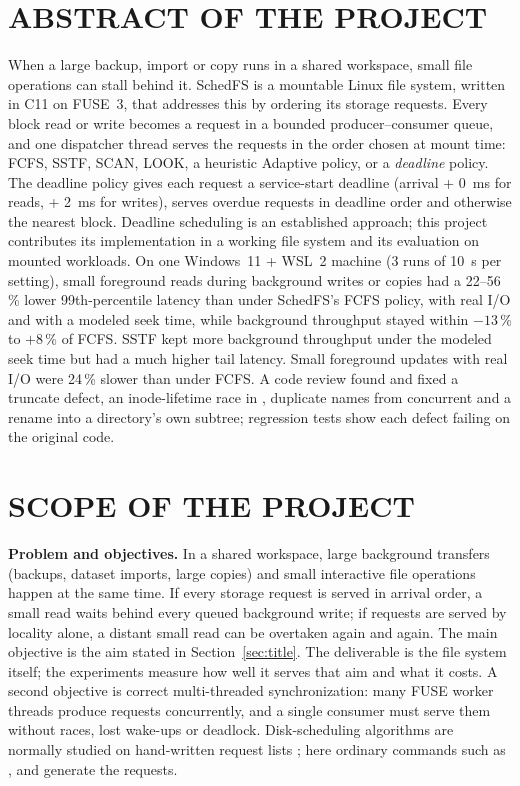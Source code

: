 \documentclass[12pt,a4paper]{article}
\DeclareRobustCommand{\code}[1]{\texttt{\detokenize{#1}}}
\begin{document}
\section{ABSTRACT OF THE PROJECT}
\label{sec:abstract}
When a large backup, import or copy runs in a shared workspace, small file operations can stall behind it. SchedFS is a mountable Linux file system, written in C11 on FUSE~3, that addresses this by ordering its storage requests. Every block read or write becomes a request in a bounded producer--consumer queue, and one dispatcher thread serves the requests in the order chosen at mount time: FCFS, SSTF, SCAN, LOOK, a heuristic Adaptive policy, or a \emph{deadline} policy. The deadline policy gives each request a service-start deadline (arrival + 0~ms for reads, + 2~ms for writes), serves overdue requests in deadline order and otherwise the nearest block. Deadline scheduling is an established approach; this project contributes its implementation in a working file system and its evaluation on mounted workloads. On one Windows~11 + WSL~2 machine (3 runs of 10~s per setting), small foreground reads during background writes or copies had a 22--56\,\% lower 99th-percentile latency than under SchedFS's FCFS policy, with real \code{O_DIRECT} I/O and with a modeled seek time, while background throughput stayed within $-13$\,\% to $+8$\,\% of FCFS. SSTF kept more background throughput under the modeled seek time but had a much higher tail latency. Small foreground updates with real I/O were 24\,\% slower than under FCFS. A code review found and fixed a truncate defect, an inode-lifetime race in \code{unlink}, duplicate names from concurrent \code{create} and a rename into a directory's own subtree; regression tests show each defect failing on the original code.

\section{SCOPE OF THE PROJECT}
\label{sec:scope}
\textbf{Problem and objectives.} In a shared workspace, large background transfers (backups, dataset imports, large copies) and small interactive file operations happen at the same time. If every storage request is served in arrival order, a small read waits behind every queued background write; if requests are served by locality alone, a distant small read can be overtaken again and again. The main objective is the aim stated in Section~\ref{sec:title}. The deliverable is the file system itself; the experiments measure how well it serves that aim and what it costs. A second objective is correct multi-threaded synchronization: many FUSE worker threads produce requests concurrently, and a single consumer must serve them without races, lost wake-ups or deadlock. Disk-scheduling algorithms are normally studied on hand-written request lists \cite{silberschatz2018,tanenbaum2015}; here ordinary commands such as \code{cp}, \code{cat} and \code{mkdir} generate the requests.
\end{document}
